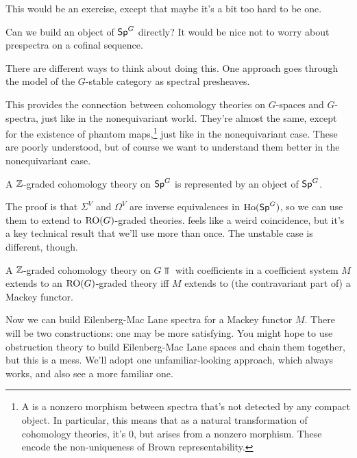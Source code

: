 This would be an exercise, except that maybe it's a bit too hard to be one.
\begin{ques}
Can we build an object of $\mathsf{Sp}^G$ directly? It would be nice not to worry about prespectra on a cofinal sequence.

There are different ways to think about doing this. One approach goes through the model of the $G$-stable category
as spectral presheaves.
\end{ques}
This provides the connection between cohomology theories on $G$-spaces and $G$-spectra, just like in the
nonequivariant world. They're almost the same, except for the existence of phantom maps,\footnote{A  is a nonzero morphism between spectra that's not detected by any compact object. In particular, this means
that as a natural transformation of cohomology theories, it's $0$, but arises from a nonzero morphism. These encode
the non-uniqueness of Brown representability.} just like in the nonequivariant case. These are poorly understood,
but of course we want to understand them better in the nonequivariant case.
\begin{cor}
\label{ZtoROG}
A $\mathbb Z$-graded cohomology theory on $\mathsf{Sp}^G$ is represented by an object of $\mathsf{Sp}^G$.
\end{cor}
The proof is that $\Sigma^V$ and $\Omega^V$ are inverse equivalences in $\operatorname{Ho}(\mathsf{Sp}^G)$, so we can use them to extend
to $\mathrm{RO}(G)$-graded theories.  feels like a weird coincidence, but it's a key technical result that
we'll use more than once. The unstable case is different, though.
\begin{cor}
\label{unstZtoR}
A $\mathbb Z$-graded cohomology theory on $G\Top$ with coefficients in a coefficient system $M$ extends to an
$\mathrm{RO}(G)$-graded theory iff $M$ extends to (the contravariant part of) a Mackey functor.
\end{cor}
Now we can build Eilenberg-Mac Lane spectra for a Mackey functor $\underline M$. There will be two constructions:
one may be more satisfying. You might hope to use obstruction theory to build Eilenberg-Mac Lane spaces and chain
them together, but this is a mess. We'll adopt one unfamiliar-looking approach, which always works, and also see a
more familiar one.
